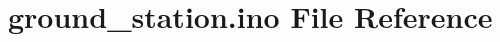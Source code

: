 \hypertarget{ground__station_8ino}{}\section{ground\+\_\+station.\+ino File Reference}
\label{ground__station_8ino}
